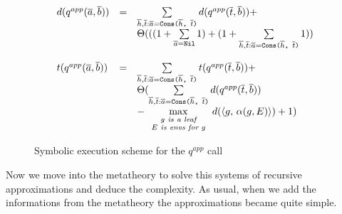 \[
\begin{array}{lcl}
d(q^{app}(\overline{a}, \overline{b})) & = & \sum\limits_{\overline{h}, \overline{t}: \overline{a} = \texttt{Cons($\overline{h}$, $\overline{t}$)}} d(q^{app}(\overline{t}, \overline{b})) +  \\
& & \Theta(((1 + \sum\limits_{\overline{a} = \texttt{Nil}} 1) + (1 + \sum\limits_{\overline{h}, \overline{t}: \overline{a} = \texttt{Cons($\overline{h}$, $\overline{t}$)}} 1)) \\
\\
t(q^{app}(\overline{a}, \overline{b})) & = & \sum\limits_{\overline{h}, \overline{t}: \overline{a} = \texttt{Cons($\overline{h}$, $\overline{t}$)}} t(q^{app}(\overline{t}, \overline{b})) + \\
& & \Theta( \sum\limits_{\overline{h}, \overline{t}: \overline{a} = \texttt{Cons($\overline{h}$, $\overline{t}$)}} d(q^{app}(\overline{t}, \overline{b})) \\
& & - \max\limits_{\scriptsize \begin{array}{c} g \textit{ is a leaf} \\ E \textit{ is envs for } g \end{array}} d(\langle g ,\, \alpha(g, E) \rangle) + 1) \\
\end{array}
\]

\begin{figure}[t]
\begin{center}
\end{center}

\caption{Symbolic execution scheme for the $q^{app}$ call}
\label{fig:appendo_scheme}
\end{figure}

Now we move into the metatheory to solve this systems of recursive approximations and deduce the complexity. As usual, when we add the informations from the metatheory the approximations became quite simple.


